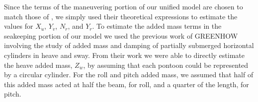\documentclass[utf8]{frontiersSCNS} %
\begin{document}
\color{red} Since the terms of the maneuvering portion of our unified model are chosen to match those of \citet{sarda16station}, we simply used their theoretical expressions to estimate the values for $X_{\dot{u}}$, $Y_{\dot{v}}$, $N_{\dot{r}}$, and $Y_{\dot{r}}$. To estimate the added mass terms in the seakeeping portion of our model we used the previous work of GREENHOW \citet{greenhow} involving the study of added mass and damping of partially submerged horizontal cylinders in heave and sway. From their work we were able to directly estimate the heave added mass, $Z_{\dot{w}}$, by assuming that each pontoon could be represented by a circular cylinder. For the roll and pitch added mass, we assumed that half of this added mass acted at half the beam, for roll, and a quarter of the length, for pitch.\color{black}
\end{document}
